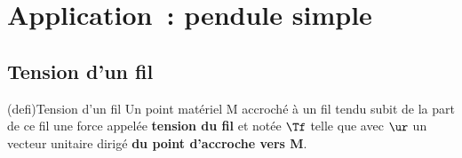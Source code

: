 \documentclass[../../main/main.tex]{subfiles}
\begin{document}
\section{Application~: pendule simple}

\subsection{Tension d'un fil}
\begin{tcb*}[sidebyside, righthand ratio=.18](defi){Tension d'un fil}
	Un point matériel M accroché à un fil tendu subit de la part de ce fil une
	force appelée \textbf{tension du fil} et notée $\Tf$ telle que
	\psw{%
		\[\boxed{\Tf = -\norm{\Tf}\ur}\]
	}%
	avec $\ur$ un vecteur unitaire dirigé \textbf{du point d'accroche vers M}.
	\tcblower
	\begin{center}
\end{center}
\end{tcb*}
\end{document}
